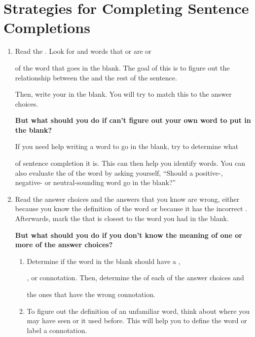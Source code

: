 \section[Strategies]{Strategies for Completing Sentence Completions}

\begin{enumerate}
\item{Read the \longline. Look for \longline and words that \longline or are \longline or

\longline of the word that goes in the blank. The goal of this is to figure out the relationship between the \longline and the rest of the sentence.}

\bigskip
Then, write your \longline in the blank. You will try to match this to the answer choices.

\bigskip
\textbf{But what should you do if can't figure out your own word to put in the blank?}

\bigskip
{If you need help writing a word to go in the blank, try to determine what

\longline of sentence completion it is. This can then help you identify \longline words. You can also evaluate the \longline of the word by asking yourself, ``Should a positive-, negative- or neutral-sounding word go in the blank?''}

\item{Read the answer choices and \longline the answers that you know are wrong, either because you know the definition of the word or because it has the incorrect \longline.}\\  Afterwards, mark the \longline that is closest to the word you had in the blank.

\textbf{But what should you do if you don't know the meaning of one or more of the answer choices?}

\begin{enumerate}[label=(\Alph*)]
\item Determine if the word in the blank should have a \longline,

\longline, or \longline connotation. Then, determine the \longline of each of the answer choices and

\longline the ones that have the wrong connotation.

\item To figure out the definition of an unfamiliar word, think about where you may have seen or \longline it used before. This will help you to define the word or label a connotation.


\end{enumerate}
\end{enumerate}
